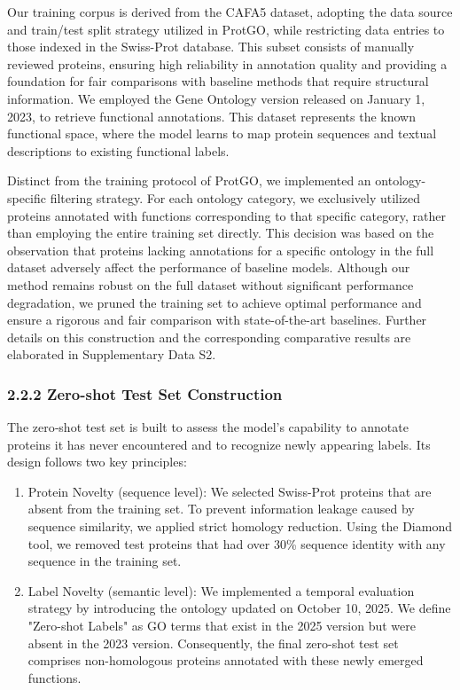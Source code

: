 \documentclass[unnumsec,webpdf,contemporary,large]{oup-authoring-template}%
\theoremstyle{thmstyleone}%
\theoremstyle{thmstyletwo}%
\theoremstyle{thmstylethree}%
\begin{document}
Our training corpus is derived from the CAFA5 dataset, adopting the data source and train/test split strategy utilized in ProtGO, while restricting data entries to those indexed in the Swiss-Prot database. This subset consists of manually reviewed proteins, ensuring high reliability in annotation quality and providing a foundation for fair comparisons with baseline methods that require structural information. We employed the Gene Ontology version released on January 1, 2023, to retrieve functional annotations. This dataset represents the known functional space, where the model learns to map protein sequences and textual descriptions to existing functional labels.

Distinct from the training protocol of ProtGO, we implemented an ontology-specific filtering strategy. For each ontology category, we exclusively utilized proteins annotated with functions corresponding to that specific category, rather than employing the entire training set directly. This decision was based on the observation that proteins lacking annotations for a specific ontology in the full dataset adversely affect the performance of baseline models. Although our method remains robust on the full dataset without significant performance degradation, we pruned the training set to achieve optimal performance and ensure a rigorous and fair comparison with state-of-the-art baselines. Further details on this construction and the corresponding comparative results are elaborated in Supplementary Data S2.

\subsubsection{2.2.2 Zero-shot Test Set Construction}
The zero‑shot test set is built to assess the model’s capability to annotate proteins it has never encountered and to recognize newly appearing labels. Its design follows two key principles:

\begin{enumerate}
    \item Protein Novelty (sequence level): We selected Swiss-Prot proteins that are absent from the training set. To prevent information leakage caused by sequence similarity, we applied strict homology reduction. Using the Diamond tool, we removed test proteins that had over 30\% sequence identity with any sequence in the training set.
    \item Label Novelty (semantic level): We implemented a temporal evaluation strategy by introducing the ontology updated on October 10, 2025. We define "Zero-shot Labels" as GO terms that exist in the 2025 version but were absent in the 2023 version. Consequently, the final zero-shot test set comprises non-homologous proteins annotated with these newly emerged functions.
\end{enumerate}
\end{document}

